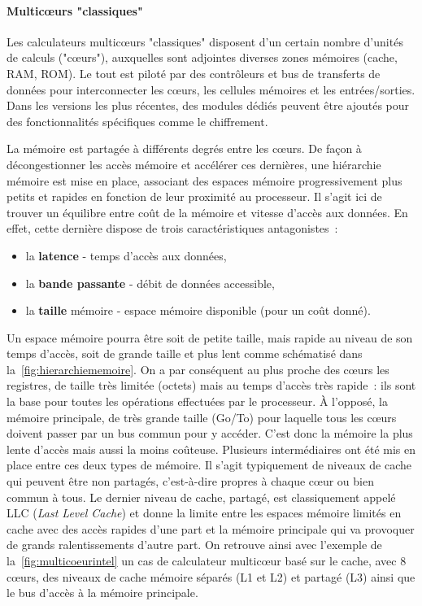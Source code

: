 \documentclass[french, a4paper, 11pt, twoside, pdftex]{StyleThese}
\begin{document}
		\paragraph{Multicœurs "classiques"}
			Les calculateurs multicœurs "classiques" disposent d'un certain nombre d'unités de calculs ("cœurs"), auxquelles sont adjointes diverses zones mémoires (cache, RAM, ROM). Le tout est piloté par des contrôleurs et bus de transferts de données pour interconnecter les cœurs, les cellules mémoires et les entrées/sorties. Dans les versions les plus récentes, des modules dédiés peuvent être ajoutés pour des fonctionnalités spécifiques comme le chiffrement. 
			
			La mémoire est partagée à différents degrés entre les cœurs. De façon à décongestionner les accès mémoire et accélérer ces dernières, une hiérarchie mémoire est mise en place, associant des espaces mémoire progressivement plus petits et rapides en fonction de leur proximité au processeur. Il s'agit ici de trouver un équilibre entre coût de la mémoire et vitesse d'accès aux données. En effet,  cette dernière dispose de trois caractéristiques antagonistes~: 
					\begin{itemize}
							\item la \textbf{latence} - temps d'accès aux données, 
							\item la \textbf{bande passante} - débit de données accessible,
							\item la \textbf{taille} mémoire - espace mémoire disponible (pour un coût donné).
						\end{itemize}
			Un espace mémoire pourra être soit de petite taille, mais rapide au niveau de son temps d'accès, soit de grande taille et plus lent comme schématisé dans la~\autoref{fig:hierarchiememoire}.  On a par conséquent au plus proche des cœurs les registres, de taille très limitée (octets) mais au temps d'accès très rapide~: ils sont la base pour toutes les opérations effectuées par le processeur. À l'opposé, la mémoire principale, de très grande taille (Go/To) pour laquelle tous les cœurs doivent passer par un bus commun pour y accéder. C'est donc la mémoire la plus lente d'accès mais aussi la moins coûteuse. Plusieurs intermédiaires ont été mis en place entre ces deux types de mémoire. Il s'agit typiquement de niveaux de cache qui peuvent être non partagés, c'est-à-dire propres à chaque cœur ou bien commun à tous. Le dernier niveau de cache, partagé, est classiquement appelé LLC (\emph{Last Level Cache}) et donne la limite entre les espaces mémoire limités en cache avec des accès rapides d'une part et la mémoire principale qui va provoquer de grands ralentissements d'autre part. 			
			On retrouve ainsi avec l'exemple de la~\autoref{fig:multicoeurintel} un cas de calculateur multicœur basé sur le cache, avec 8 cœurs, des niveaux de cache mémoire séparés (L1 et L2) et partagé (L3) ainsi que le bus d'accès à la mémoire principale. 
			
\end{document}
